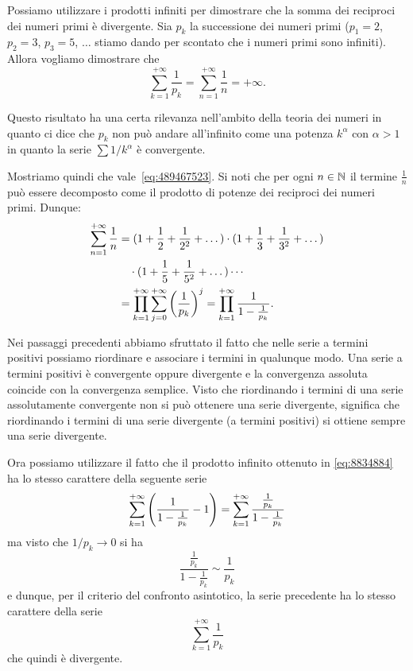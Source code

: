 \begin{example}
%
%
Possiamo utilizzare i prodotti infiniti per dimostrare che la somma
dei reciproci dei numeri primi è divergente.
Sia $p_k$ la successione dei numeri
primi ($p_1=2$, $p_2=3$, $p_3=5$, $\dots$ stiamo dando per scontato che i numeri
primi sono infiniti). Allora vogliamo dimostrare che
\begin{equation}\label{eq:489467523}
  \sum_{k=1}^{+\infty} \frac{1}{p_k} = \sum_{n=1}^{+\infty} \frac{1}{n} = +\infty.
\end{equation}

Questo risultato ha una certa rilevanza nell'ambito della teoria dei numeri
in quanto ci dice che $p_k$ non può andare all'infinito come una
potenza $k^\alpha$ con $\alpha>1$ in quanto la serie $\sum 1/k^\alpha$
è convergente.

Mostriamo quindi che vale~\eqref{eq:489467523}.
Si noti che per ogni $n\in {\mathbb N}$ il termine $\frac 1 n$
può essere decomposto come il prodotto di
potenze dei reciproci dei numeri primi. Dunque:
\begin{equation}\label{eq:8834884}
\begin{aligned}
\sum_{n=1}^{+\infty} \frac{1}{n}
&= (1 + \frac 1 2 + \frac 1 {2^2} + \dots) \cdot
  (1 + \frac 1 3 + \frac 1 {3^2} + \dots) \\
  &\quad \cdot(1 + \frac 1 5 + \frac 1 {5^2} + \dots) \cdots \\
  &= \prod_{k=1}^{+\infty} \sum_{j=0}^{+\infty} {\left( \frac{1}{p_k} \right)}^j
  = \prod_{k=1}^{+\infty} \frac{1}{1-\frac 1 {p_k}}.
\end{aligned}
\end{equation}

Nei passaggi precedenti abbiamo sfruttato il fatto che nelle serie a termini
positivi possiamo riordinare e associare i termini in qualunque modo.
Una serie a termini positivi è convergente oppure divergente e la convergenza
assoluta coincide con la convergenza semplice.
Visto che riordinando i termini di una serie assolutamente convergente non
si può ottenere una serie divergente, significa che riordinando i termini di una
serie divergente (a termini positivi) si ottiene sempre una serie divergente.

Ora possiamo utilizzare il fatto che il prodotto infinito ottenuto
in \eqref{eq:8834884} ha lo stesso carattere
della seguente serie
\[
  \sum_{k=1}^{+\infty} {\left( \frac{1}{1-\frac 1 {p_k}}-1 \right)}
  = \sum_{k=1}^{+\infty} \frac{\frac 1 {p_k}}{1-\frac{1}{p_k}}
\]
ma visto che $1/p_k\to 0$ si ha
\[
  \frac{\frac 1 {p_k}}{1-\frac{1}{p_k}}
  \sim \frac 1 {p_k}
\]
e dunque, per il criterio del confronto asintotico, la serie precedente ha
lo stesso carattere della serie
\[
\sum_{k=1}^{+\infty} \frac{1}{p_k}
\]
che quindi è divergente.
\end{example}

